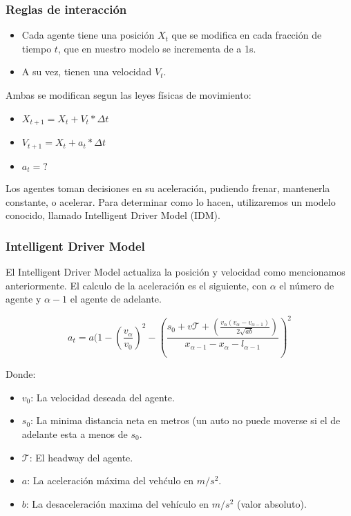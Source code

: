 \documentclass[10pt, compress]{beamer}
\begin{document}
\begin{frame}[fragile]

\frametitle{Reglas de interacci\'on}
\begin{itemize}
\item Cada agente tiene una posici\'on $X_t$ que se modifica en cada fracci\'on de tiempo $t$, que en nuestro modelo se incrementa de a 1s.
\item A su vez, tienen una velocidad $V_t$.
\end{itemize}
Ambas se modifican segun las leyes f\'isicas de movimiento:
\begin{itemize}
\item $X_{t+1} = X_t + V_t * \Delta t$
\item $V_{t+1} = X_t + a_t * \Delta t$
\item $a_t = ?$ 
\end{itemize}

Los agentes toman decisiones en su aceleraci\'on, pudiendo frenar, mantenerla constante, o acelerar. Para determinar como lo hacen, utilizaremos un modelo conocido, llamado Intelligent Driver Model (IDM). \supercite{1}

\end{frame}

\begin{frame}[fragile]

\frametitle{Intelligent Driver Model}
El Intelligent Driver Model actualiza la posici\'on y velocidad como mencionamos anteriormente. El calculo de la aceleraci\'on es el siguiente, con $\alpha$ el n\'umero de agente y $\alpha - 1$ el agente de adelante.

  \begin{equation*}
    a_t = a (1 - (\frac{v_\alpha}{v_0})^2 - (\frac{s_0 + v\mathcal{T} + (\frac{v_\alpha (v_\alpha - v_{\alpha-1})}{2\sqrt{ab}})}{x_{\alpha-1} - x_\alpha - l_{\alpha-1}})^2
  \end{equation*}

Donde:
\begin{itemize}
\item $v_0$: La velocidad deseada del agente.
\item $s_0$: La minima distancia neta en metros (un auto no puede moverse si el de adelante esta a menos de $s_0$.
\item $\mathcal{T}$: El headway del agente.
\item $a$: La aceleraci\'on m\'axima del veh\'culo en $m/s^2$.
\item $b$: La desaceleraci\'on maxima del veh\'iculo en $m/s^2$ (valor absoluto).
\end{itemize}

\end{frame}
\end{document}
